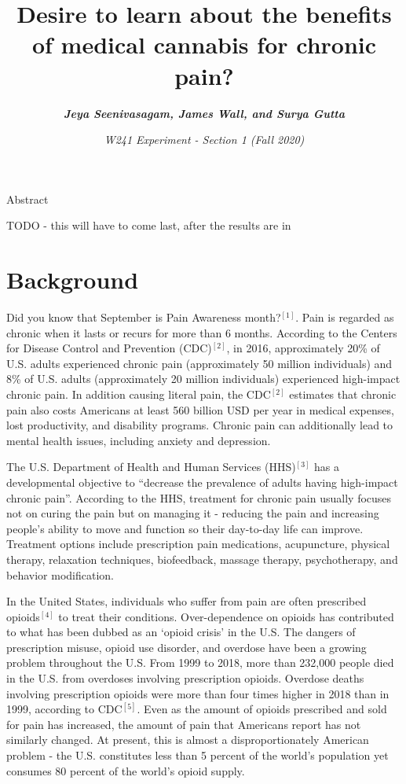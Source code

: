 \documentclass[
]{article}
\title{\textbf{Desire to learn about the benefits of medical cannabis for
chronic pain?}}
\author{\textbf{\emph{Jeya Seenivasagam, James Wall, and Surya Gutta}}}
\date{\emph{W241 Experiment - Section 1 (Fall 2020)}}
\begin{document}
\maketitle

{
\setcounter{tocdepth}{2}
\tableofcontents
}
\pagebreak

\begin{center}
Abstract
\end{center}
\begin{center}
TODO - this will have to come last, after the results are in
\end{center}

\hypertarget{background}{%
\section{Background}\label{background}}

Did you know that September is Pain Awareness month?\(^{[1]}\). Pain is
regarded as chronic when it lasts or recurs for more than 6 months.
According to the Centers for Disease Control and Prevention
(CDC)\(^{[2]}\), in 2016, approximately 20\% of U.S. adults experienced
chronic pain (approximately 50 million individuals) and 8\% of U.S.
adults (approximately 20 million individuals) experienced high-impact
chronic pain. In addition causing literal pain, the CDC\(^{[2]}\)
estimates that chronic pain also costs Americans at least 560 billion
USD per year in medical expenses, lost productivity, and disability
programs. Chronic pain can additionally lead to mental health issues,
including anxiety and depression.

The U.S. Department of Health and Human Services (HHS)\(^{[3]}\) has a
developmental objective to ``decrease the prevalence of adults having
high-impact chronic pain''. According to the HHS, treatment for chronic
pain usually focuses not on curing the pain but on managing it -
reducing the pain and increasing people's ability to move and function
so their day-to-day life can improve. Treatment options include
prescription pain medications, acupuncture, physical therapy, relaxation
techniques, biofeedback, massage therapy, psychotherapy, and behavior
modification.

In the United States, individuals who suffer from pain are often
prescribed opioids\(^{[4]}\) to treat their conditions. Over-dependence
on opioids has contributed to what has been dubbed as an `opioid crisis'
in the U.S. The dangers of prescription misuse, opioid use disorder, and
overdose have been a growing problem throughout the U.S. From 1999 to
2018, more than 232,000 people died in the U.S. from overdoses involving
prescription opioids. Overdose deaths involving prescription opioids
were more than four times higher in 2018 than in 1999, according to
CDC\(^{[5]}\). Even as the amount of opioids prescribed and sold for
pain has increased, the amount of pain that Americans report has not
similarly changed. At present, this is almost a disproportionately
American problem - the U.S. constitutes less than 5 percent of the
world's population yet consumes 80 percent of the world's opioid supply.
\end{document}
